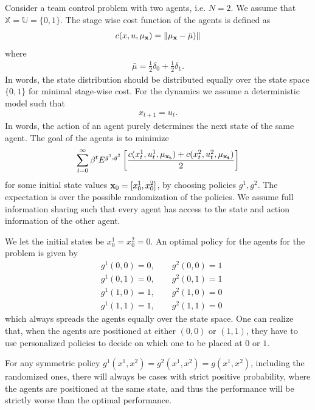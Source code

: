 \documentclass[twoside,11pt]{article}
\begin{document}
\begin{example}\label{counter_ex}
Consider a team control problem with two agents, i.e. $N=2$. We assume that $\mathds{X}=\mathds{U}=\{0,1\}$. The stage wise cost function of the agents is defined as
\begin{align*}
c(x,u,\mu_{\bf x}) = \|\mu_{\bf x}-\bar{\mu})\|
\end{align*} 
where 
\begin{align*}
\bar{\mu}=\frac{1}{2}\delta_0 + \frac{1}{2}\delta_1.
\end{align*}
In words, the state distribution should be distributed equally over the state space $\{0,1\}$ for minimal stage-wise cost. For the dynamics we assume a deterministic model such that
\begin{align*}
x_{t+1}=u_t.
\end{align*}
In words, the action of an agent purely determines the next state of the same agent. The goal of the agents is to minimize
\begin{align*}
\sum_{t=0}^{\infty}\beta^t E^{g^1,g^2}\left[\frac{c(x_t^1,u_t^1,\mu_{\bf x_t}) +c(x_t^2,u_t^2,\mu_{\bf x_t})  }{2}\right]
\end{align*}
for some initial state values ${\bf{x}}_0=[x_0^1,x_0^2]$, by choosing policies $g^1,g^2$. The expectation is over the possible randomization of the policies.  We assume full information sharing such that every agent has access to the state and action information of the other agent. 

We let the initial states be $x_0^1=x_0^2=0$. An optimal policy for the agents for the problem is given by
\begin{align*}
&g^1(0,0)= 0, \qquad g^2(0,0)=1\\
&g^1(0,1)= 0 ,\qquad g^2(0,1)=1\\
 &g^1(1,0)= 1 ,\qquad g^2(1,0)=0\\
&g^1(1,1)= 1 ,\qquad g^2(1,1)=0
\end{align*}
which always spreads the agents equally over the state space. One can realize that, when the agents are positioned at either $(0,0)$ or $(1,1)$, they have to use personalized policies to decide on which one to be placed at $0$ or $1$. 

For any symmetric policy $g^1(x^1,x^2)=g^2(x^1,x^2)=g(x^1,x^2)$, including the randomized ones, there will always be cases with strict positive probability, where the agents are positioned at the same state, and thus the performance will be strictly worse than the optimal performance.
\end{example}
\end{document}
